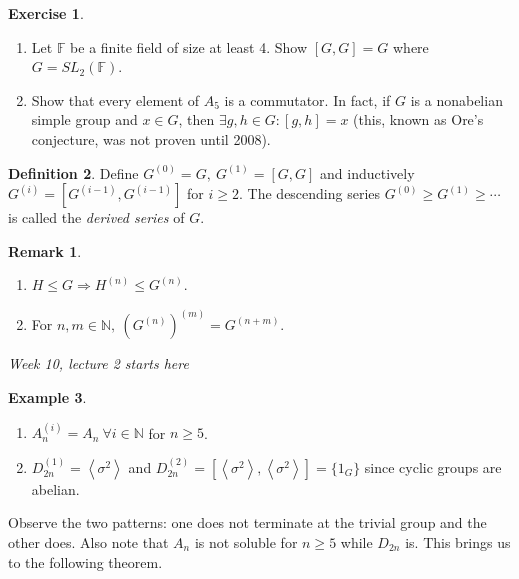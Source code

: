 \documentclass[a4paper]{article}
\newcommand{\la}{\left\langle}
\newcommand{\ra}{\right\rangle}
\newcommand{\N}{\mathbb{N}}
\theoremstyle{definition}
\newtheorem{defn}{Definition}[subsection]
\newtheorem{example}[defn]{Example}
\newtheorem{exe}[defn]{Exercise}
\newtheorem*{remark}{Remark}
\begin{document}
\begin{exe}
\begin{enumerate}
\item Let $\mathbb F$ be a finite field of size at least 4. Show $[G,G]=G$ where $G=SL_2(\mathbb F)$.
\item Show that every element of $A_5$ is a commutator. In fact, if $G$ is a nonabelian simple group and $x\in G$, then $\exists g,h\in G:[g,h]=x$ (this, known as Ore's conjecture, was not proven until 2008).
\end{enumerate}
\end{exe}

\begin{defn}
\label{defn:derivedseries}
Define $G^{(0)}=G,\ G^{(1)}=[G,G]$ and inductively $G^{(i)}=[G^{(i-1)},G^{(i-1)}]$ for $i\geq 2$. The descending series $G^{(0)}\geq G^{(1)}\geq\cdots$ is called the \textit{derived series} of $G$.
\end{defn}
\begin{remark}
\begin{enumerate}
\item $H\leq G\Rightarrow H^{(n)}\leq G^{(n)}$.
\item For $n,m\in\N,\ \left(G^{(n)}\right)^{(m)}=G^{(n+m)}$.
\end{enumerate}
\end{remark}

\begin{flushright}
\textit{Week 10, lecture 2 starts here}
\end{flushright}

\begin{example}
\begin{enumerate}
\item $A_n^{(i)}=A_n \ \forall i\in\N$ for $n\geq 5$.
\item $D_{2n}^{(1)}=\la\sigma^2\ra$ and $D_{2n}^{(2)}=[\la\sigma^2\ra,\la\sigma^2\ra]=\{1_G\}$ since cyclic groups are abelian.
\end{enumerate}
Observe the two patterns: one does not terminate at the trivial group and the other does. Also note that $A_n$ is not soluble for $n\geq 5$ while $D_{2n}$ is. This brings us to the following theorem.
\end{example}
\end{document}
